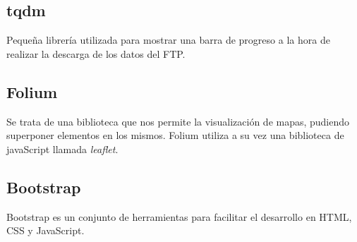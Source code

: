 	\subsection{tqdm}\label{tqdm}
Pequeña librería utilizada para mostrar una barra de progreso a la hora de realizar la descarga de los datos del FTP.
	\subsection{Folium}
Se trata de una biblioteca que nos permite la visualización de mapas, pudiendo superponer elementos en los mismos. Folium utiliza a su vez una biblioteca de javaScript llamada \emph{leaflet}.

	\subsection{Bootstrap}
Bootstrap es un conjunto de herramientas para facilitar el desarrollo en HTML, CSS y JavaScript.
